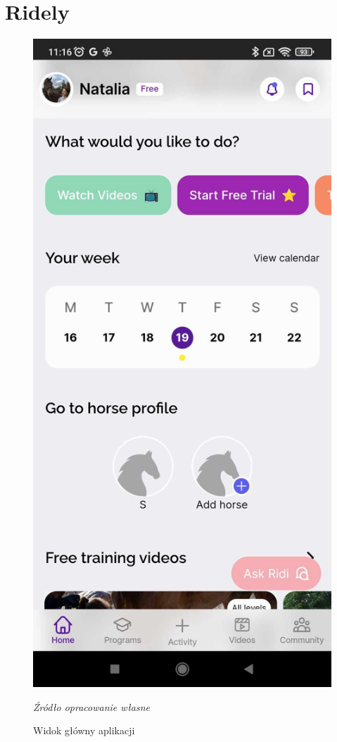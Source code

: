 \documentclass[12pt,oneside]{report}
\begin{document}
\section{Ridely}
\begin{figure}
	\centering
	\includegraphics[scale=0.15]{ridely4}
	\caption{Widok główny aplikacji}
	\textit{Źródło opracowanie własne}
	\label{RidelyKalendarz}
\end{figure}
\end{document}
